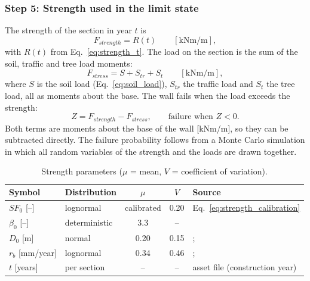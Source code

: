 \subsubsection*{Step 5: Strength used in the limit state}
The strength of the section in year $t$ is
\begin{equation}
  F_{strength} = R(t) \qquad [\mathrm{kNm/m}], \label{eq:F_strength}
\end{equation}
with $R(t)$ from Eq.~\ref{eq:strength_t}. The load on the section is the sum
of the soil, traffic and tree load moments:
\begin{equation}
  F_{stress} = S + S_{tr} + S_t \qquad [\mathrm{kNm/m}], \label{eq:F_stress}
\end{equation}
where $S$ is the soil load (Eq.~\ref{eq:soil_load}), $S_{tr}$ the traffic
load and $S_t$ the tree load, all as moments about the base. The wall fails
when the load exceeds the strength:
\begin{equation}
  Z = F_{strength} - F_{stress}, \qquad \text{failure when } Z < 0.
  \label{eq:Z}
\end{equation}
Both terms are moments about the base of the wall [kNm/m], so they can be
subtracted directly. The failure probability follows from a Monte Carlo
simulation in which all random variables of the strength and the loads are
drawn together.

\begin{table}[htbp]
  \centering
  \small
  \caption{Strength parameters ($\mu$ = mean, $V$ = coefficient of
           variation).}
  \label{tab:strength_distributions}
  \begin{tabular}{@{}llccp{4.2cm}@{}}
    \toprule
    Symbol & Distribution & $\mu$ & $V$ & Source \\
    \midrule
    $SF_0$ [--]     & lognormal     & calibrated & 0.20 & Eq.~\ref{eq:strength_calibration} \\
    $\beta_0$ [--]  & deterministic & 3.3  & --   & \textcite{nen_en1990} \\
    $D_0$ [m]       & normal        & 0.20 & 0.15 & \textcite{sharma2023}; \textcite{erfgoed156} \\
    $r_b$ [mm/year] & lognormal     & 0.34 & 0.46 & \textcite{hemel2024}; \textcite{klaassen2009} \\
    $t$ [years]     & per section   & --   & --   & asset file (construction year) \\
    \bottomrule
  \end{tabular}
\end{table}



